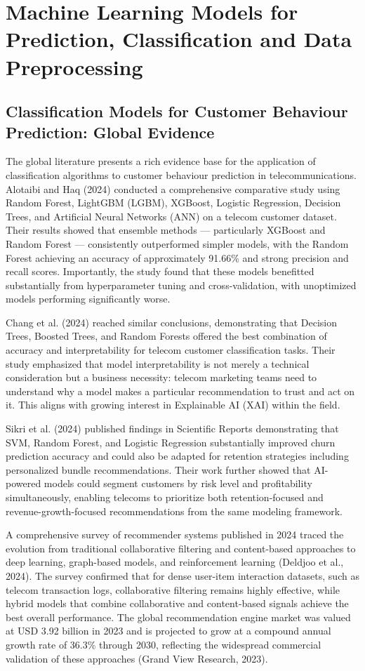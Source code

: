 \section{Machine Learning Models for Prediction, Classification and Data Preprocessing}


\subsection{Classification Models for Customer Behaviour Prediction: Global Evidence}

The global literature presents a rich evidence base for the application of classification algorithms to customer behaviour prediction in telecommunications. Alotaibi and Haq (2024) conducted a comprehensive comparative study using Random Forest, LightGBM (LGBM), XGBoost, Logistic Regression, Decision Trees, and Artificial Neural Networks (ANN) on a telecom customer dataset. Their results showed that ensemble methods --- particularly XGBoost and Random Forest --- consistently outperformed simpler models, with the Random Forest achieving an accuracy of approximately 91.66\% and strong precision and recall scores. Importantly, the study found that these models benefitted substantially from hyperparameter tuning and cross-validation, with unoptimized models performing significantly worse.

Chang et al. (2024) reached similar conclusions, demonstrating that Decision Trees, Boosted Trees, and Random Forests offered the best combination of accuracy and interpretability for telecom customer classification tasks. Their study emphasized that model interpretability is not merely a technical consideration but a business necessity: telecom marketing teams need to understand why a model makes a particular recommendation to trust and act on it. This aligns with growing interest in Explainable AI (XAI) within the field.

Sikri et al. (2024) published findings in Scientific Reports demonstrating that SVM, Random Forest, and Logistic Regression substantially improved churn prediction accuracy and could also be adapted for retention strategies including personalized bundle recommendations. Their work further showed that AI-powered models could segment customers by risk level and profitability simultaneously, enabling telecoms to prioritize both retention-focused and revenue-growth-focused recommendations from the same modeling framework.

A comprehensive survey of recommender systems published in 2024 traced the evolution from traditional collaborative filtering and content-based approaches to deep learning, graph-based models, and reinforcement learning (Deldjoo et al., 2024). The survey confirmed that for dense user-item interaction datasets, such as telecom transaction logs, collaborative filtering remains highly effective, while hybrid models that combine collaborative and content-based signals achieve the best overall performance. The global recommendation engine market was valued at USD 3.92 billion in 2023 and is projected to grow at a compound annual growth rate of 36.3\% through 2030, reflecting the widespread commercial validation of these approaches (Grand View Research, 2023).



